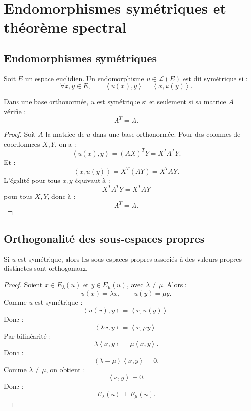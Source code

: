 \documentclass[11pt,a4paper]{article}
\newcommand{\Lcal}{\mathcal L}
\newcommand{\scal}[2]{\left\langle #1,#2\right\rangle}
\begin{document}
\section{Endomorphismes symétriques et théorème spectral}

\subsection{Endomorphismes symétriques}

\begin{definitionbox}
Soit \(E\) un espace euclidien.  
Un endomorphisme \(u\in\Lcal(E)\) est dit symétrique si :
\[
\forall x,y\in E,\qquad
\scal{u(x)}{y}=\scal{x}{u(y)}.
\]
\end{definitionbox}

\begin{theorembox}
Dans une base orthonormée, \(u\) est symétrique si et seulement si sa matrice \(A\) vérifie :
\[
A^T=A.
\]
\end{theorembox}

\begin{proof}
Soit \(A\) la matrice de \(u\) dans une base orthonormée.  
Pour des colonnes de coordonnées \(X,Y\), on a :
\[
\scal{u(x)}{y}=(AX)^TY=X^TA^TY.
\]
Et :
\[
\scal{x}{u(y)}=X^T(AY)=X^TAY.
\]
L'égalité pour tous \(x,y\) équivaut à :
\[
X^TA^TY=X^TAY
\]
pour tous \(X,Y\), donc à :
\[
A^T=A.
\]
\end{proof}

\subsection{Orthogonalité des sous-espaces propres}

\begin{theorembox}
Si \(u\) est symétrique, alors les sous-espaces propres associés à des valeurs propres distinctes sont orthogonaux.
\end{theorembox}

\begin{proof}
Soient \(x\in E_\lambda(u)\) et \(y\in E_\mu(u)\), avec \(\lambda\neq\mu\).  
Alors :
\[
u(x)=\lambda x,
\qquad
u(y)=\mu y.
\]
Comme \(u\) est symétrique :
\[
\scal{u(x)}{y}=\scal{x}{u(y)}.
\]
Donc :
\[
\scal{\lambda x}{y}
=
\scal{x}{\mu y}.
\]
Par bilinéarité :
\[
\lambda\scal{x}{y}
=
\mu\scal{x}{y}.
\]
Donc :
\[
(\lambda-\mu)\scal{x}{y}=0.
\]
Comme \(\lambda\neq\mu\), on obtient :
\[
\scal{x}{y}=0.
\]
Donc :
\[
E_\lambda(u)\perp E_\mu(u).
\]
\end{proof}
\end{document}
